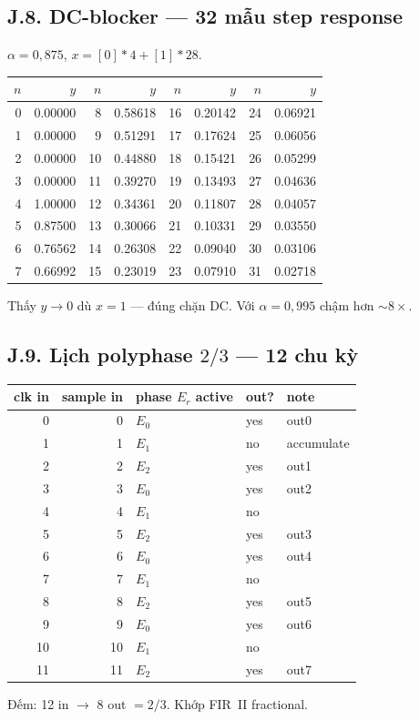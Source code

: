 \subsection*{J.8. DC-blocker --- 32 mẫu step response}
$\alpha=0{,}875$, $x=[0]{*}4+[1]{*}28$.
\begin{center}\scriptsize
\begin{tabular}{@{}rrrrrrrr@{}}
\toprule
$n$ & $y$ & $n$ & $y$ & $n$ & $y$ & $n$ & $y$ \\
\midrule
0 & 0.00000 & 8 & 0.58618 & 16 & 0.20142 & 24 & 0.06921 \\
1 & 0.00000 & 9 & 0.51291 & 17 & 0.17624 & 25 & 0.06056 \\
2 & 0.00000 & 10 & 0.44880 & 18 & 0.15421 & 26 & 0.05299 \\
3 & 0.00000 & 11 & 0.39270 & 19 & 0.13493 & 27 & 0.04636 \\
4 & 1.00000 & 12 & 0.34361 & 20 & 0.11807 & 28 & 0.04057 \\
5 & 0.87500 & 13 & 0.30066 & 21 & 0.10331 & 29 & 0.03550 \\
6 & 0.76562 & 14 & 0.26308 & 22 & 0.09040 & 30 & 0.03106 \\
7 & 0.66992 & 15 & 0.23019 & 23 & 0.07910 & 31 & 0.02718 \\
\bottomrule
\end{tabular}
\end{center}
Thấy $y\to0$ dù $x=1$ --- đúng chặn DC. Với $\alpha=0{,}995$ chậm hơn $\sim8\times$.

\subsection*{J.9. Lịch polyphase $2/3$ --- 12 chu kỳ}
\begin{center}\scriptsize
\begin{tabular}{@{}rrlll@{}}
\toprule
clk in & sample in & phase $E_r$ active & out? & note \\
\midrule
0 & 0 & $E_0$ & yes & out0 \\
1 & 1 & $E_1$ & no & accumulate \\
2 & 2 & $E_2$ & yes & out1 \\
3 & 3 & $E_0$ & yes & out2 \\
4 & 4 & $E_1$ & no &  \\
5 & 5 & $E_2$ & yes & out3 \\
6 & 6 & $E_0$ & yes & out4 \\
7 & 7 & $E_1$ & no &  \\
8 & 8 & $E_2$ & yes & out5 \\
9 & 9 & $E_0$ & yes & out6 \\
10 & 10 & $E_1$ & no &  \\
11 & 11 & $E_2$ & yes & out7 \\
\bottomrule
\end{tabular}
\end{center}
Đếm: 12 in $\to$ 8 out $=2/3$. Khớp FIR~II fractional.

